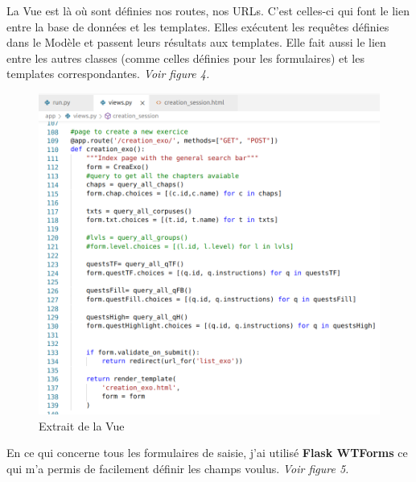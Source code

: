 \documentclass[12pt]{article}
\begin{document}
La Vue est là où sont définies nos routes, nos URLs. C'est celles-ci qui font le lien entre la base de données et les templates. Elles exécutent les requêtes définies dans le Modèle et passent leurs résultats aux templates. Elle fait aussi le lien entre les autres classes (comme celles définies pour les formulaires) et les templates correspondantes. \textit{Voir figure 4.}

\begin{figure}[h]
    \centering
    \includegraphics[scale=0.3]{ex_views.png}
    \caption{Extrait de la Vue}
    \label{fig:ex_views}
\end{figure}


En ce qui concerne tous les formulaires de saisie, j'ai utilisé \textbf{Flask WTForms} ce qui m'a permis de facilement définir  les champs voulus. \textit{Voir figure 5.}
\end{document}
